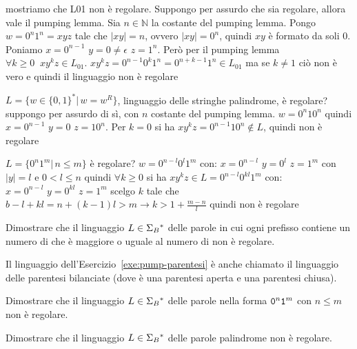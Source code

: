 \begin{example}
mostriamo che L01 non è regolare. Suppongo per assurdo che sia regolare, allora vale il pumping lemma. Sia $n\in\mathbb{N}$ la costante del pumping lemma. Pongo $w=0^n1^n=xyz$ tale che $|xy|=n$, ovvero $|xy|=0^n$, quindi $xy$ è formato da soli 0. Poniamo $x=0^{n-1}\,\,y=0\neq \epsilon\,\, z=1^n$. Però per il pumping lemma $\forall k\geq 0\,\,\ xy^kz\in L_{01}$.
$xy^kz=0^{n-1}0^k1^n=0^{n+k-1}1^n\in L_{01}$
ma se $k\neq 1$ ciò non è vero e quindi il linguaggio non è regolare
\end{example}
\begin{example}
$L=\{w\in\{0,1\}^*|\, w=w^R\}$, linguaggio delle stringhe palindrome, è regolare?
suppongo per assurdo di sì, con $n$ costante del pumping lemma.
$w=0^n10^n$ quindi $x=0^{n-1}\,\,y=0\,\,z=10^n$.
Per $k=0$ si ha $xy^kz=0^{n-1}10^n\not\in L$, quindi non è regolare
\end{example}
\begin{example}
$L=\{0^n1^m|\, n\leq m\}$ è regolare?
$w=0^{n-l}0^l1^{m}$ con:
$x=0^{n-l}\,\,y=0^l\,\,z=1^{m}$
con $|y|=l$ e $0<l\leq n$
quindi $\forall k\geq 0$ si ha $xy^kz\in L=0^{n-l}0^{kl}1^{m}$ con:
$x=0^{n-l}\,\,y=0^{kl}\,\,z=1^{m}$
scelgo $k$ tale che $b-l+kl=n+(k-1)l>m\to k> 1+\frac{m-n}{l}$ quindi non è regolare
\end{example}


\begin{Exercise}\label{exe:pump-parentesi}
Dimostrare che il linguaggio $L\in\Sigma_{B}{}^{\ast}$ delle parole in cui ogni prefisso contiene un numero di \zero che è
maggiore o uguale al numero di \uno non è regolare.
\end{Exercise}

Il linguaggio dell'Esercizio~\ref{exe:pump-parentesi} è anche chiamato il linguaggio delle parentesi bilanciate (dove
\zero è una parentesi aperta e \uno una parentesi chiusa).


\begin{Exercise}\label{exe:pump-tanti-1}
Dimostrare che il linguaggio $L\in\Sigma_{B}{}^{\ast}$ delle parole nella forma $\mathtt{0}^n\mathtt{1}^m$ con $n\leq m$
non è regolare.
\end{Exercise}

\begin{Exercise}\label{exe:pump-palindrome}
Dimostrare che il linguaggio $L\in\Sigma_{B}{}^{\ast}$ delle parole palindrome
non è regolare.
\end{Exercise}



